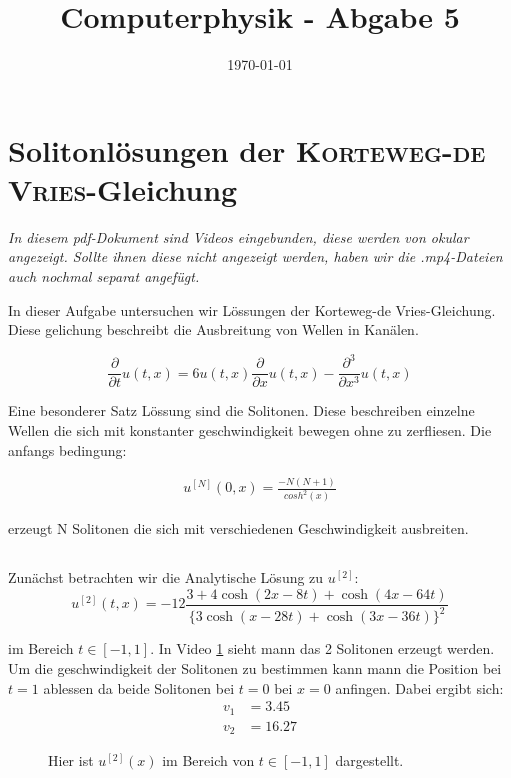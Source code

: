 \documentclass[ngerman]{scrartcl}
\title{Computerphysik - Abgabe 5}
\date{\today}
\begin{document}
	\setcounter{section}{9}
	\thispagestyle{fancy}
	\renewcommand{\thesection}{H.\arabic{section}:}
	\renewcommand{\thesubsection}{H\arabic{section}.\arabic{subsection}}
	
\section{Solitonlösungen der \textsc{Korteweg-de Vries}-Gleichung}

\textit{In diesem pdf-Dokument sind Videos eingebunden, diese werden von \emph{okular} angezeigt. Sollte ihnen diese nicht angezeigt werden, haben wir die .mp4-Dateien auch nochmal separat angefügt.}

In dieser Aufgabe untersuchen wir L\"ossungen der Korteweg-de Vries-Gleichung.
Diese gelichung beschreibt die Ausbreitung von Wellen in Kan\"alen.

\begin{equation*}
\frac{\partial}{\partial t} u(t, x)=6 u(t, x) \frac{\partial}{\partial x} u(t, x)-\frac{\partial^{3}}{\partial x^{3}} u(t, x)
\end{equation*}

Eine besonderer Satz L\"ossung sind die Solitonen.
Diese beschreiben einzelne Wellen die sich mit konstanter geschwindigkeit bewegen ohne zu zerfliesen.
Die anfangs bedingung:

\begin{align}
	u^{[N]}(0,x)=\frac{-N(N+1)}{cosh^2(x)}
\end{align}

erzeugt N Solitonen die sich mit verschiedenen Geschwindigkeit ausbreiten.
\subsection{}

Zunächst betrachten wir die Analytische Lösung zu $u^{[2]}$:
\begin{equation*}
u^{[2]}(t, x)=-12 \frac{3+4 \cosh (2 x-8 t)+\cosh (4 x-64 t)}{\{3 \cosh (x-28 t)+\cosh (3 x-36 t)\}^{2}}
\end{equation*}

im Bereich $t\in[-1,1]$. 
In Video \ref{vid:H10.1} sieht mann das 2 Solitonen erzeugt werden.
Um die geschwindigkeit der Solitonen zu bestimmen kann mann die Position bei $t=1$ ablessen
da beide Solitonen bei $t=0$ bei $x=0$ anfingen. Dabei ergibt sich:
\begin{align*}
	v_1&=3.45\\
	v_2&=16.27
\end{align*}
\begin{figure}[htbp]
	\centering
	\caption[2 Solitonen]{Hier ist $u^{[2]}(x)$ im Bereich von $t\in[-1,1]$ dargestellt.}
	\label{vid:H10.1}
\end{figure}
\end{document}

